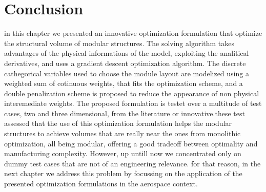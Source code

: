 \section{Conclusion}
in this chapter we presented an innovative optimization formulation that optimize the structural volume of modular structures. The solving algorithm takes advantages of the physical informations of the model, exploiting the analitical derivatives, and uses a gradient descent optimization algorithm. The discrete cathegorical variables used to choose the module layout are modelized using a weighted sum of cotinuous weights, that fits the optimization scheme, and a double penalization scheme is proposed to reduce the appearance of non physical interemediate weights. The proposed formulation is testet over a multitude of test cases, two and three dimensional, from the literature or innovative.these test assessed that the use of this optimization formulation helps the modular structures to achieve volumes that are really near the ones from monolithic optimization, all being modular, offering a good tradeoff between optimality and manufacturing complexity. However, up untill now we concentrated only on dummy test cases that are not of an engineering relevance. for that reason, in the next chapter we address this problem by focussing on the application of the presented optimization formulations in the aerospace context. 
